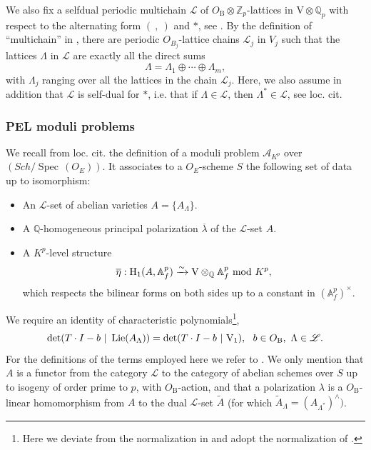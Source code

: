\documentclass[reqno, 10pt]{amsart}
\newcommand{\BA}{\ensuremath{\mathbb {A}}\xspace}
\newcommand{\BQ}{\ensuremath{\mathbb {Q}}\xspace}
\newcommand{\BZ}{\ensuremath{\mathbb {Z}}\xspace}
\newcommand{\CA}{\ensuremath{\mathcal {A}}\xspace}
\newcommand{\RB}{\ensuremath{\mathrm {B}}\xspace}
\newcommand{\RH}{\ensuremath{\mathrm {H}}\xspace}
\newcommand{\RV}{\ensuremath{\mathrm {V}}\xspace}
\DeclareMathOperator{\Lie}{Lie}
\DeclareMathOperator{\Spec}{Spec\,}
\theoremstyle{definition}
\numberwithin{equation}{subsection}
\numberwithin{subsubsection}{subsection}
\begin{document}
We also fix a selfdual periodic multichain ${\mathscr L}$ of $O_\RB\otimes \BZ_p$-lattices in $\RV\otimes\BQ_p$ with respect to the
alternating form $(\ ,\ )$ and $*$, see \cite[Def. 3.13]{RZbook}. By the definition of ``multichain''   in \cite[Def. 3.4]{RZbook}, there are periodic $O_{B_j}$-lattice chains $\mathscr L_j$ in $V_j$ such that the lattices $\Lambda$  in $\mathscr L$ are exactly all the  direct sums 
\[
\Lambda=\Lambda_1\oplus \cdots \oplus \Lambda_m,
\]
with $\Lambda_j$ ranging over all the lattices in the chain $\mathscr L_j$. Here, we also assume in addition that $\mathscr L$ is self-dual for $*$, i.e. that if $\Lambda\in \mathscr L$, then $\Lambda^*\in \mathscr L$, see loc. cit.

\subsubsection{PEL moduli problems}\label{sss:PELmoduli} 
We recall from loc. cit. the definition of a moduli problem ${\CA}_{K^p}$ over $(Sch/\Spec({O}_{E}))$. It associates to a
${O}_{E}$-scheme $S$ the following set of data up to isomorphism:
\begin{itemize}
\item[1.] An ${\mathscr L}$-set of abelian varieties $A=\{ A_\Lambda\}$.
\item[2.] A $\BQ$-homogeneous principal polarization $\overline\lambda$ of
the ${\mathscr L}$-set $A$.
\item[3.] A $K^p$-level structure
$$
\overline\eta :\RH_1(A,{\BA}_f^p)\xrightarrow{\sim} \RV\otimes_\BQ {\BA}_f^p\ {\rm mod}\
K^p ,
$$
 which respects the bilinear forms on both sides up to a
constant in $({\BA}_f^p)^\times$.
\end{itemize}

 We require an identity of characteristic polynomials\footnote{Here we deviate from the normalization in \cite{RZbook} and adopt  the normalization of \cite[footnotes p. 200, p. 230]{SWberkeley}. }, 
$$
 {\rm{det}}
(T\cdot I-b\ \vert\  \Lie(A_\Lambda))={\rm{det}} (T\cdot I-b\ \vert\
\RV_1),\ \ b\in O_\RB,\ \Lambda\in {\mathscr L} . 
$$
 For the definitions of the
terms employed here we refer to \cite[\S 6.3--6.8]{RZbook}. We only mention that
$A$ is a functor from the category ${\mathscr L}$ to the category of abelian
schemes over $S$ up to isogeny of order prime to $p$, with $O_\RB$-action,
and that a polarization $\lambda$ is a ${O}_\RB$-linear homomorphism
from $A$ to the dual ${\mathscr L}$-set $\tilde A$ (for which $\tilde
A_\Lambda=(A_{\Lambda^*})^\wedge)$.
\end{document}
